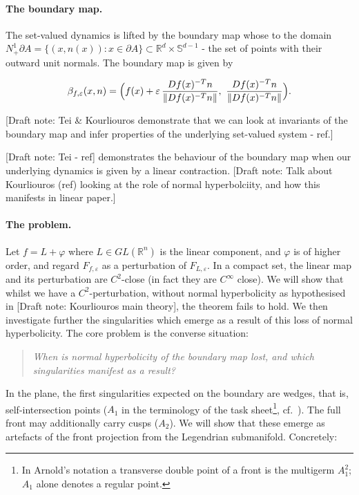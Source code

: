 \documentclass[11pt,a4paper]{article}
\newif\ifdraftnotes \draftnotestrue
\newcommand{\note}[1]{\ifdraftnotes{\color{BrickRed}\textsf{\footnotesize[Draft note: #1]}}\fi}
\theoremstyle{definition}
\theoremstyle{remark}
\newcommand{\R}{\mathbb{R}}
\newcommand{\eps}{\varepsilon}
\newcommand{\Sph}{\mathbb{S}}
\newcommand{\Nb}{N^1_+\partial A}
\begin{document}
\paragraph{The boundary map.}
The set-valued dynamics is lifted by the boundary map whose to the domain $\Nb=\{(x,n(x)): x\in\partial A\}\subset\R^d\times\Sph^{d-1}$ - the set of points with their outward unit normals. The boundary map is given by

\begin{equation}\label{eq:boundary-map}
  \beta_{f,\eps}(x,n) = \Bigl(f(x) + \eps\,\frac{Df(x)^{-T}n}{\|Df(x)^{-T}n\|},\ \frac{Df(x)^{-T}n}{\|Df(x)^{-T}n\|}\Bigr).
\end{equation}

 \note{Tei \& Kourliouros demonstrate that we can look at invariants of the boundary map and infer properties of the underlying set-valued system - ref.}

\note{Tei - ref} demonstrates the behaviour of the boundary map when our underlying dynamics is given by a linear contraction. \note{Talk about Kourliouros (ref) looking at the role of normal hyperbolciity, and how this manifests in linear paper.} 

\paragraph{The problem.}Let $f=L+\varphi$ where $L \in GL(\R^n)$ is the linear component, and $\varphi$ is of higher order, and regard $F_{f,\eps}$ as a perturbation of $F_{L,\eps}$. In a compact set, the linear map and its perturbation are $C^2$-close (in fact they are $C^\infty$ close). We will show that whilst we have a $C^2$-perturbation,  without normal hyperbolicity as hypothesised in \note{Kourliouros main theory}, the theorem fails to hold. We then investigate further the singularities which emerge as a result of this loss of normal hyperbolicity. The core problem is the converse situation:
\begin{quote}
\emph{When is normal hyperbolicity of the boundary map lost, and which singularities manifest as a result?} 
\end{quote}

In the plane, the first singularities expected on the boundary are wedges, that is, self-intersection points
($A_1$ in the terminology of the task sheet\footnote{In Arnold's notation a transverse double point of a front is the
multigerm $A_1^2$; $A_1$ alone denotes a regular point.}, cf.~\cite{Arn90}). The full front may additionally carry cusps ($A_2$). We will show that these emerge as artefacts of the front projection from the Legendrian submanifold. Concretely: 
\end{document}
